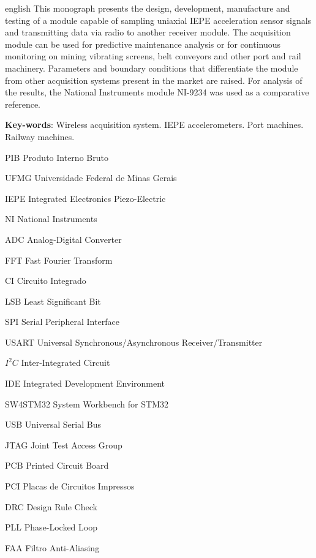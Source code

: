 \documentclass[
	12pt,				%
	openright,			%
	twoside,			%
	a4paper,			%
	english,			%
	french,				%
	spanish,			%
	brazil,				%
	]{abntex2}
\begin{document}
\begin{resumo}[Abstract]
	\begin{otherlanguage*}{english}
		This monograph presents the design, development, manufacture and testing of a module capable of sampling uniaxial IEPE acceleration sensor signals and transmitting data via radio to another receiver module. The acquisition module can be used for predictive maintenance analysis or for continuous monitoring on mining vibrating screens, belt conveyors and other port and rail machinery. Parameters and boundary conditions that differentiate the module from other acquisition systems present in the market are raised. For analysis of the results, the National Instruments module NI-9234 was used as a comparative reference.

		\vspace{\onelineskip}
		
		\noindent 
		\textbf{Key-words}: Wireless acquisition system. IEPE accelerometers. Port machines. Railway machines.
	\end{otherlanguage*}
\end{resumo}

\listoffigures*
\cleardoublepage


\begin{siglas}
	\item[PIB] Produto Interno Bruto
	\item[UFMG] Universidade Federal de Minas Gerais
	\item[IEPE] Integrated Electronics Piezo-Electric
	\item[NI] National Instruments
	\item[ADC] Analog-Digital Converter
	\item[FFT] Fast Fourier Transform
	\item[CI] Circuito Integrado
	\item[LSB] Least Significant Bit
	\item[SPI] Serial Peripheral Interface
	\item[USART] Universal Synchronous/Asynchronous Receiver/Transmitter
	\item[$I^2C$] Inter-Integrated Circuit
	\item[IDE] Integrated Development Environment
	\item[SW4STM32] System Workbench for STM32
	\item[USB] Universal Serial Bus
	\item[JTAG] Joint Test Access Group
	\item[PCB] Printed Circuit Board
	\item[PCI] Placas de Circuitos Impressos
	\item[DRC] Design Rule Check
	\item[PLL] Phase-Locked Loop
	\item[FAA] Filtro Anti-Aliasing
\end{siglas}
\end{document}
